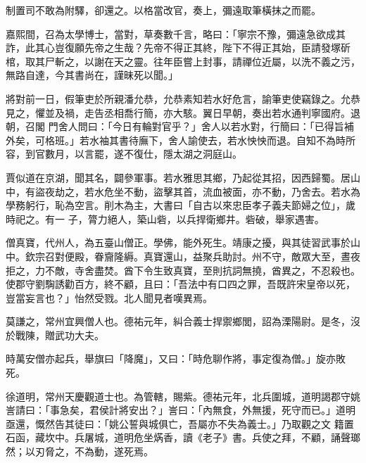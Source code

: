 \begin{pinyinscope}
 制置司不敢為附驛，卻還之。以格當改官，奏上，彌遠取筆橫抹之而罷。



 嘉熙間，召為太學博士，當對，草奏數千言，略曰：「寧宗不豫，彌遠急欲成其詐，此其心豈復願先帝之生哉？先帝不得正其終，陛下不得正其始，臣請發塚斫棺，取其尸斬之，以謝在天之靈。往年臣嘗上封事，請禪位近屬，以洗不義之污，無路自達，今其書尚在，謹昧死以聞。」



 將對前一日，假筆吏於所親潘允恭，允恭素知若水好危言，諭筆吏使竊錄之。允恭見之，懼並及禍，走告丞相喬行簡，亦大駭。翼日早朝，奏出若水通判寧國府。退朝，召閣
 門舍人問曰：「今日有輪對官乎？」舍人以若水對，行簡曰：「已得旨補外矣，可格班。」若水袖其書待廡下，舍人諭使去，若水怏怏而退。自知不為時所容，到官數月，以言罷，遂不復仕，隱太湖之洞庭山。



 賈似道在京湖，聞其名，闢參軍事。若水雅思其鄉，乃起從其招，因西歸蜀。居山中，有盜夜劫之，若水危坐不動，盜擊其首，流血被面，亦不動，乃舍去。若水為學務躬行，恥為空言。削木為主，大書曰「自古以來忠臣孝子義夫節婦之位」，歲時祀之。有一
 子，膂力絕人，築山砦，以兵捍衛鄉井。砦破，舉家遇害。



 僧真寶，代州人，為五臺山僧正。學佛，能外死生。靖康之擾，與其徒習武事於山中。欽宗召對便殿，眷齎隆縟。真寶還山，益聚兵助討。州不守，敵眾大至，晝夜拒之，力不敵，寺舍盡焚。酋下令生致真寶，至則抗詞無撓，酋異之，不忍殺也。使郡守劉騊誘勸百方，終不顧，且曰：「吾法中有口四之罪，吾既許宋皇帝以死，豈當妄言也？」怡然受戮。北人聞見者嘆異焉。



 莫謙之，常州宜興僧人也。德祐元年，糾合義士捍禦鄉閭，詔為溧陽尉。是冬，沒於戰陳，贈武功大夫。



 時萬安僧亦起兵，舉旗曰「降魔」，又曰：「時危聊作將，事定復為僧。」旋亦敗死。



 徐道明，常州天慶觀道士也。為管轄，賜紫。德祐元年，北兵圍城，道明謁郡守姚訔請曰：「事急矣，君侯計將安出？」訔曰：「內無食，外無援，死守而已。」道明亟還，慨然告其徒曰：「姚公誓與城俱亡，吾屬亦不失為義士。」乃取觀之文
 籍置石函，藏坎中。兵屠城，道明危坐焫香，讀《老子》書。兵使之拜，不顧，誦聲瑯然；以刃脅之，不為動，遂死焉。



\end{pinyinscope}